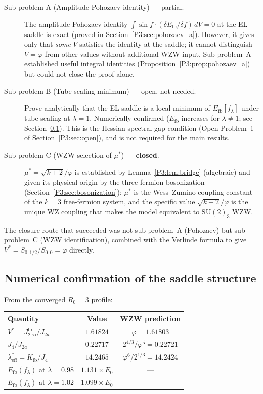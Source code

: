 \documentclass[11pt,a4paper]{article}
\theoremstyle{definition}
\theoremstyle{remark}
\newcommand{\vp}{\varphi}
\newcommand{\Jfb}{J_{2\mathrm{iso}}^{\mathrm{fb}}}
\newcommand{\Ja}{J_{2a}}
\newcommand{\leff}{\lambda_{\mathrm{eff}}}
\begin{document}
\begin{description}
\item[Sub-problem A (Amplitude Pohozaev identity) --- partial.]
  The amplitude Pohozaev identity $\int \sin f \cdot (\delta E_{\mathrm{fb}}/\delta f)\,dV = 0$
  at the EL saddle is exact (proved in Section~\ref{P3:sec:pohozaev_a}).
  However, it gives only that \emph{some} $V$ satisfies the identity
  at the saddle; it cannot distinguish $V=\vp$ from other values without
  additional WZW input.  Sub-problem~A established useful integral identities
  (Proposition~\ref{P3:prop:pohozaev_a}) but could not close the proof alone.

\item[Sub-problem B (Tube-scaling minimum) --- open, not needed.]
  Prove analytically that the EL saddle is a local minimum of
  $E_{\mathrm{fb}}[f_\lambda]$ under tube scaling at $\lambda=1$.
  Numerically confirmed ($E_{\mathrm{fb}}$ increases for $\lambda\neq 1$;
  see Section~\ref{P3:sec:saddle_num}).  This is the Hessian spectral gap
  condition (Open Problem~1 of Section~\ref{P3:sec:open}), and is not
  required for the main results.

\item[Sub-problem C (WZW selection of $\mu^*$) --- \textbf{closed}.]
  $\mu^* = \sqrt{k+2}/\vp$ is established by Lemma~\ref{P3:lem:bridge}
  (algebraic) and given its physical origin by the three-fermion
  bosonization (Section~\ref{P3:sec:bosonization}): $\mu^*$ is the
  Wess--Zumino coupling constant of the $k=3$ free-fermion system,
  and the specific value $\sqrt{k+2}/\vp$ is the unique WZ coupling
  that makes the model equivalent to $\mathrm{SU}(2)_3$ WZW.
\end{description}

The closure route that succeeded was not sub-problem~A (Pohozaev) but
sub-problem~C (WZW identification), combined with the Verlinde formula
to give $V^* = S_{0,1/2}/S_{0,0} = \vp$ directly.

\subsection{Numerical confirmation of the saddle structure}
\label{P3:sec:saddle_num}

From the converged $R_0=3$ profile:

\begin{center}
\renewcommand{\arraystretch}{1.3}
\begin{tabular}{lcc}
\toprule
Quantity & Value & WZW prediction \\
\midrule
$V^* = \Jfb/\Ja$ & $1.61824$ & $\vp = 1.61803$ \\
$J_4/J_{2a}$ & $0.22717$ & $2^{4/3}/\vp^5 = 0.22721$ \\
$\leff^* = K_{\mathrm{fb}}/J_4$ & $14.2465$ & $\vp^6/2^{1/3} = 14.2424$ \\
$E_{\mathrm{fb}}(f_\lambda)$ at $\lambda=0.98$ & $1.131\times E_0$ & --- \\
$E_{\mathrm{fb}}(f_\lambda)$ at $\lambda=1.02$ & $1.099\times E_0$ & --- \\
\bottomrule
\end{tabular}
\end{center}
\end{document}
